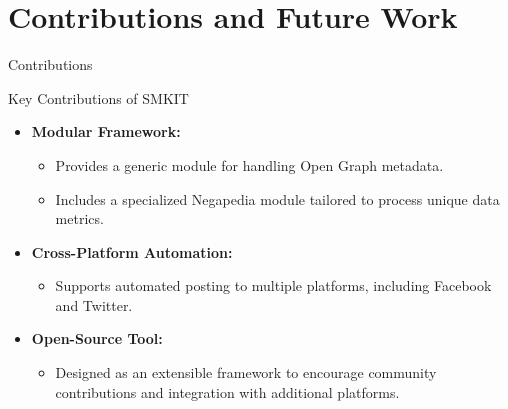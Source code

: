 \documentclass{beamer}
\begin{document}
\section{Contributions and Future Work}
    \begin{frame}{Contributions}
        \begin{block}{Key Contributions of SMKIT}
            \begin{itemize}
                \item \textbf{Modular Framework:}
                    \begin{itemize}
                        \item Provides a generic module for handling Open Graph metadata.
                        \item Includes a specialized Negapedia module tailored to process unique data metrics.
                    \end{itemize}
                \item \textbf{Cross-Platform Automation:}
                    \begin{itemize}
                        \item Supports automated posting to multiple platforms, including Facebook and Twitter.
                    \end{itemize}
                \item \textbf{Open-Source Tool:}
                    \begin{itemize}
                        \item Designed as an extensible framework to encourage community contributions and integration with additional platforms.
                    \end{itemize}
            \end{itemize}
        \end{block}
    \end{frame}
\end{document}
